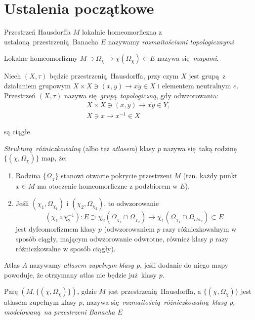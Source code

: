 \chapter{Ustalenia początkowe}
\begin{definicja}\cite[s. 253]{maurin2}
    Przestrzeń Hausdorffa \(M\) lokalnie homeomorficzna z
    ustaloną przestrzenią Banacha \(E\) nazywamy \emph{rozmaitościami topologicznymi}
    
    Lokalne homeomorfizmy
    \(M \supset \Omega_{\chi} \rightarrow \chi(\Omega_{\chi}) \subset E\) nazywa
się \emph{mapami}.

\begin{definicja}\cite[s. 41]{maurin2}
    Niech \((X, \tau)\) będzie przestrzenią Hausdorffa, przy czym \(X\) jest grupą z działaniem
    grupowym \(X\times X \ni (x, y) \rightarrow x\dot y \in X\) i elementem neutralnym \(e\).
    Przestrzeń \((X, \tau)\) nazywa się \emph{grupą topologiczną}, gdy odwzorowania:
    \begin{align*}
        X\times X \ni (x, y) \rightarrow x \dot y \in Y, \\ 
        X \ni x \rightarrow x^{-1} \in X
    \end{align*}
\end{definicja} są ciągłe.

\end{definicja}
\begin{definicja}\cite[s. 253]{maurin2}
\emph{Strukturą różniczkowalną} (albo też \emph{atlasem}) klasy \(p\) nazywa się taką
rodzinę \( \{(\chi, \Omega_{\chi})\} \) map, że:
\begin{enumerate}[label=(\alph*)]
    \item Rodzina \(\{\Omega_{\chi}\}\) stanowi otwarte pokrycie przestrzeni \(M\) (tzn. każdy punkt
        \(x\in M\) ma otoczenie homeomorficzne z podzbiorem w \(E\)).
    \item Jeśli \((\chi_1, \Omega_{\chi_1})\) i \((\chi_2, \Omega_{\chi_2})\), to odwzorowanie
        \begin{equation*}
            (\chi_1 \circ \chi_2^{-1}): E \supset \chi_2(\Omega_{\chi_1} \cap \Omega_{\chi_2})
            \rightarrow \chi_1(\Omega_{\chi_1} \cap \Omega_{chi_2}) \subset E 
        \end{equation*}
        jest dyfeomorfizmem klasy \(p\) (odwzorowaniem \(p\) razy różniczkowalnym w sposób ciągły,
        mającym odwzorowanie odwrotne, również klasy \(p\) razy różniczkowalne w sposób ciągły).
\end{enumerate}
\end{definicja}
\begin{definicja}\cite[s. 253]{maurin2}
    Atlas \(A\) nazywamy \emph{atlasem zupełnym klasy p}, jeśli dodanie do niego mapy powoduje, że
    otrzymany atlas nie będzie już klasy \(p\).
\end{definicja}
\begin{definicja}\cite[s. 253]{maurin2}
    Parę \((M, \{(\chi, \Omega_{\chi})\})\), gdzie \(M\) jest przestrzenią Hausdorffa, a \(\{(\chi, 
        \Omega_\chi)\}\) jest atlasem zupełnym klasy \(p\), nazywa
        się \emph{rozmaitością różniczkowalną klasy p, modelowaną na przestrzeni Banacha \(E\)}
\end{definicja}

